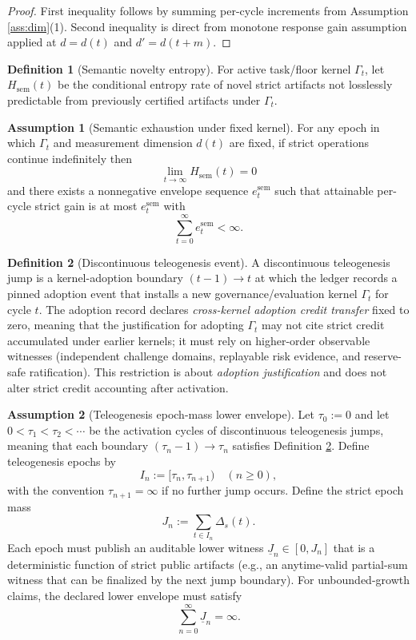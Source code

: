 \documentclass[11pt,a4paper]{article}
\theoremstyle{definition}
\newtheorem{definition}{Definition}
\newtheorem{assumption}{Assumption}
\theoremstyle{remark}
\begin{document}
\begin{proof}
First inequality follows by summing per-cycle increments from Assumption \ref{ass:dim}(1).
Second inequality is direct from monotone response gain assumption applied at $d=d(t)$ and $d'=d(t+m)$.
\end{proof}

\begin{definition}[Semantic novelty entropy]\label{def:semantic_novelty_entropy}
For active task/floor kernel $\Gamma_t$, let $H_{\mathrm{sem}}(t)$ be the conditional entropy rate of novel strict artifacts not losslessly predictable from previously certified artifacts under $\Gamma_t$.
\end{definition}

\begin{assumption}[Semantic exhaustion under fixed kernel]\label{ass:exhaust}
For any epoch in which $\Gamma_t$ and measurement dimension $d(t)$ are fixed, if strict operations continue indefinitely then
\[
\lim_{t\to\infty}H_{\mathrm{sem}}(t)=0
\]
and there exists a nonnegative envelope sequence $e^{\mathrm{sem}}_t$ such that attainable per-cycle strict gain is at most $e^{\mathrm{sem}}_t$ with
\[
\sum_{t=0}^{\infty}e^{\mathrm{sem}}_t<\infty.
\]
\end{assumption}

\begin{definition}[Discontinuous teleogenesis event]\label{def:discontinuous_teleogenesis_event}
A discontinuous teleogenesis jump is a kernel-adoption boundary $(t-1)\to t$ at which the ledger records a pinned adoption event that installs a new governance/evaluation kernel $\Gamma_t$ for cycle $t$.
The adoption record declares \emph{cross-kernel adoption credit transfer} fixed to zero, meaning that the justification for adopting $\Gamma_t$ may not cite strict credit accumulated under earlier kernels; it must rely on higher-order observable witnesses (independent challenge domains, replayable risk evidence, and reserve-safe ratification).
This restriction is about \emph{adoption justification} and does not alter strict credit accounting after activation.
\end{definition}

\begin{assumption}[Teleogenesis epoch-mass lower envelope]\label{ass:jumpmass}
Let $\tau_0:=0$ and let $0<\tau_1<\tau_2<\cdots$ be the activation cycles of discontinuous teleogenesis jumps, meaning that each boundary $(\tau_n-1)\to\tau_n$ satisfies Definition \ref{def:discontinuous_teleogenesis_event}.
Define teleogenesis epochs by
\[
I_n:=[\tau_n,\tau_{n+1})\quad (n\ge 0),
\]
with the convention $\tau_{n+1}=\infty$ if no further jump occurs.
Define the strict epoch mass
\[
J_n:=\sum_{t\in I_n}\Delta_s(t).
\]
Each epoch must publish an auditable lower witness $\underline J_n\in[0,J_n]$ that is a deterministic function of strict public artifacts (e.g., an anytime-valid partial-sum witness that can be finalized by the next jump boundary).
For unbounded-growth claims, the declared lower envelope must satisfy
\[
\sum_{n=0}^{\infty}\underline J_n=\infty.
\]
\end{assumption}
\end{document}
